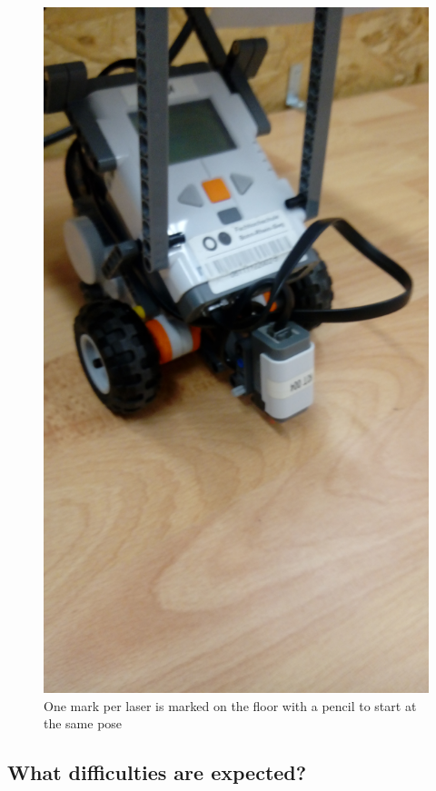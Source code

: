 \documentclass[10pt]{scrartcl}
\begin{document}
\begin{figure}[ht!]
\centering
\includegraphics[angle=-90,trim={1200 700 1000 300},clip,scale=0.10]{images/initChecker}
\caption{One mark per laser is marked on the floor with a pencil to start at the same pose}
\label{fig:initMatcher}
\end{figure}


\subsection{What difficulties are expected?}
\end{document}

